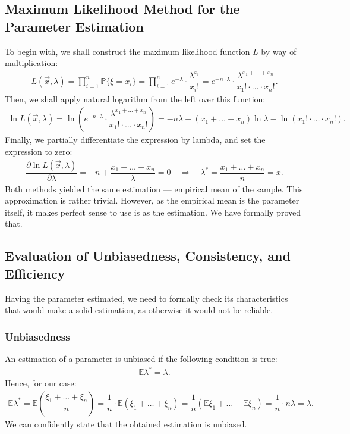 \documentclass[final,3p,times,onecolumn]{elsarticle}
\begin{document}
\subsection{Maximum Likelihood Method for the Parameter Estimation}
To begin with, we shall construct the maximum likelihood function $L$ by way of multiplication: 
\begin{gather*}
L(\vec{x}, \lambda) = \prod_{i=1}^n \mathbb{P}\{\xi = x_i\} =
\prod_{i=1}^n e^{-\lambda} \cdot \dfrac{\lambda^{x_i}}{x_i!} = 
e^{-n \cdot \lambda} \cdot \dfrac{\lambda^{x_1 + \ldots + x_n}}{x_1! \cdot \ldots \cdot x_n!}.
\end{gather*}
Then, we shall apply natural logarithm from the left over this function: 
\begin{gather*}
\ln L(\vec{x}, \lambda) = 
\ln \left( e^{-n \cdot \lambda} \cdot \dfrac{\lambda^{x_1 + \ldots + x_n}}{x_1! \cdot \ldots \cdot x_n!} \right) =
-n\lambda + (x_1 + \ldots + x_n)\ln \lambda - \ln(x_1! \cdot \ldots \cdot x_n!).
\end{gather*}
Finally, we partially differentiate the expression by lambda, and set the expression to zero: 
\begin{gather*}
\dfrac{\partial \ln L(\vec{x}, \lambda)}{\partial \lambda} =
 -n + \dfrac{x_1 + \ldots + x_n}{\lambda} = 0 \quad \Longrightarrow \quad \lambda^* =
\dfrac{x_1 + \ldots + x_n}{n} = \overline{x}.
\end{gather*}
Both methods yielded the same estimation --- empirical mean of the sample. 
This approximation is rather trivial. However, as the empirical mean is the parameter itself, 
it makes perfect sense to use is as the estimation. We have formally proved that. 

\subsection{Evaluation of Unbiasedness, Consistency, and Efficiency}
Having the parameter estimated, we need to formally check its characteristics that would make
a solid estimation, as otherwise it would not be reliable. 

\subsubsection{Unbiasedness}
An estimation of a parameter is unbiased if the following condition is true: 
\begin{gather*}
\mathbb{E}\lambda^* = \lambda.
\end{gather*}
Hence, for our case:
\begin{gather*}
\mathbb{E}\lambda^* =
\mathbb{E} \left(\dfrac{\xi_1 + \ldots + \xi_n}{n}\right) = 
\dfrac{1}{n}\cdot \mathbb{E}\left(\xi_1 + \ldots + \xi_n \right) = 
\dfrac{1}{n} \left( \mathbb{E}\xi_1 + \ldots + \mathbb{E}\xi_n \right) = 
\dfrac{1}{n} \cdot n\lambda = \lambda.
\end{gather*}
We can confidently state that the obtained estimation is unbiased. 
\end{document}
